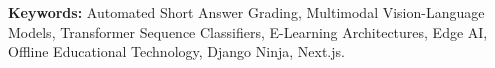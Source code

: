 \documentclass[12pt,a4paper,oneside]{report}
\begin{document}
\vspace{0.4cm}
\noindent\textbf{Keywords:} Automated Short Answer Grading, Multimodal Vision-Language Models, Transformer Sequence Classifiers, E-Learning Architectures, Edge AI, Offline Educational Technology, Django Ninja, Next.js.

\newpage
\tableofcontents

\newpage
\listoftables

\newpage
\listoffigures

\newpage
\listofalgorithms
{}

\newpage
{}
\setcounter{page}{1}



\newpage


\newpage


\newpage


\newpage


\newpage

\end{document}
